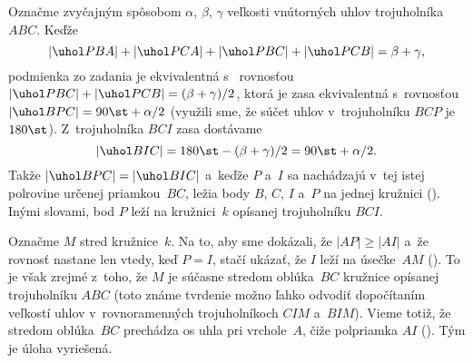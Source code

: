 {%
Označme zvyčajným spôsobom $\alpha$, $\beta$, $\gamma$ veľkosti vnútorných uhlov trojuholníka $ABC$. Keďže
$$
|\uhol PBA|+|\uhol PCA|+|\uhol PBC|+|\uhol PCB|=\beta+\gamma,
$$
podmienka zo zadania je ekvivalentná s~ rovnosťou $|\uhol PBC|+|\uhol PCB|=(\beta+\gamma)/2$, ktorá je zasa ekvivalentná s~rovnosťou $|\uhol BPC|=90\st+\alpha/2$
%
(využili sme, že súčet uhlov v~trojuholníku $BCP$ je $180\st$).
Z~trojuholníka $BCI$ zasa dostávame
$$
|\uhol BIC|=180\st-(\beta+\gamma)/2=90\st+\alpha/2.
$$
Takže $|\uhol BPC|=|\uhol BIC|$ a~keďže $P$ a~$I$ sa nachádzajú v~tej istej polrovine určenej priamkou~$BC$, ležia body $B$, $C$, $I$ a~$P$ na jednej kružnici (\obr). Inými slovami, bod $P$ leží na kružnici~$k$ opísanej trojuholníku $BCI$.

Označme $M$ stred kružnice~$k$. Na to, aby sme dokázali, že $|AP|\ge|AI|$ a~že rovnosť nastane len vtedy, keď $P=I$, stačí ukázať, že $I$ leží na úsečke~$AM$ (\obr).
%
To je však zrejmé z~toho, že $M$ je súčasne stredom oblúka~$BC$ kružnice opísanej trojuholníku $ABC$ (toto známe tvrdenie možno ľahko odvodiť dopočítaním veľkostí uhlov v~rovnoramenných trojuholníkoch $CIM$ a~$BIM$).
%
Vieme totiž, že stredom oblúka~$BC$ prechádza os uhla pri vrchole~$A$, čiže polpriamka $AI$ (\obr). Tým je úloha vyriešená.
}


